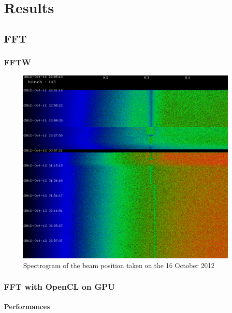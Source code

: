%

\chapter{Results}

\section{FFT}

\subsection{FFTW}

\begin{figure}
\caption{Spectrogram of the beam position taken on the 16 October 2012}
\centering
\includegraphics[scale=0.2]{spectrogram.pdf}
\end{figure}

   \subsection{FFT with OpenCL on GPU}

   \subsubsection{Performances}

